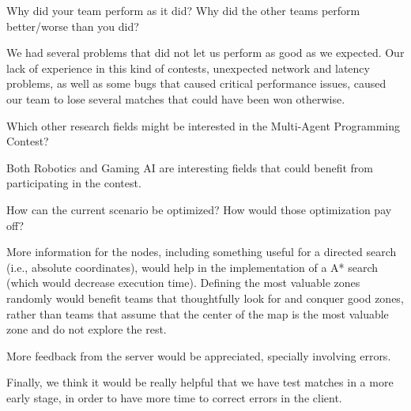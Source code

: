 \begin{question}
Why did your team perform as it did? Why did the other teams perform
better/worse than you did?
\end{question}

We had several problems that did not let us perform as good as we expected.  Our
lack of experience in this kind of contests, unexpected network and latency
problems, as well as some bugs that caused critical performance issues, caused
our team to lose several matches that could have been won otherwise.

\begin{question}
Which other research fields might be interested in the Multi-Agent
Programming Contest?
\end{question}

Both Robotics and Gaming AI are interesting fields that could benefit from
participating in the contest.

\begin{question}
How can the current scenario be optimized? How would those optimization pay off?
\end{question}

More information for the nodes, including something useful for a directed search
(i.e., absolute coordinates), would help in the implementation of a A* search
(which would decrease execution time). Defining the most valuable zones
randomly would benefit teams that thoughtfully look for and conquer good zones,
rather than teams that assume that the center of the map is the most valuable
zone and do not explore the rest.

More feedback from the server would be appreciated, specially involving errors.

Finally, we think it would be really helpful that we have test matches in
a more early stage, in order to have more time to correct errors in the client.
